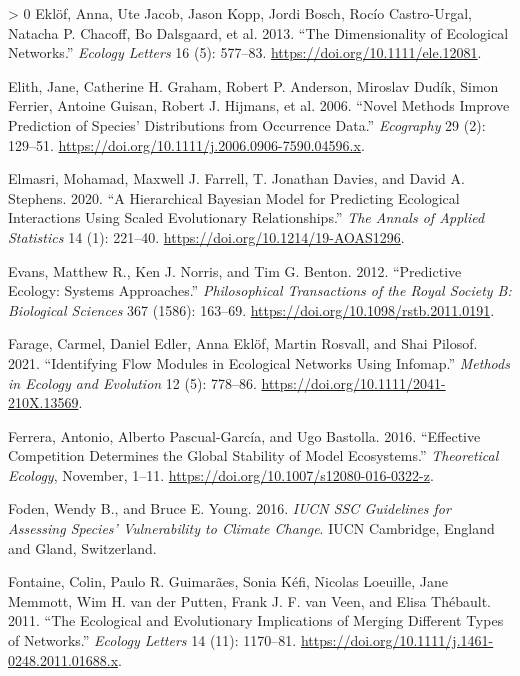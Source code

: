 \documentclass[10pt,oneside]{article}
\newlength{\cslhangindent}
\newenvironment{CSLReferences}[3] %
 {%
  \setlength{\parindent}{0pt}
  \ifodd #1 \everypar{\setlength{\hangindent}{\cslhangindent}}\ignorespaces\fi
  \ifnum #2 > 0
  \setlength{\parskip}{#2\baselineskip}
  \fi
 }%
 {}
\begin{document}
\begin{CSLReferences}{1}{0}
\leavevmode\hypertarget{ref-Eklof2013DimEco}{}%
Eklöf, Anna, Ute Jacob, Jason Kopp, Jordi Bosch, Rocío Castro-Urgal,
Natacha P. Chacoff, Bo Dalsgaard, et al. 2013. {``The Dimensionality of
Ecological Networks.''} \emph{Ecology Letters} 16 (5): 577--83.
\url{https://doi.org/10.1111/ele.12081}.

\leavevmode\hypertarget{ref-Elith2006NovMet}{}%
Elith, Jane, Catherine H. Graham, Robert P. Anderson, Miroslav Dudík,
Simon Ferrier, Antoine Guisan, Robert J. Hijmans, et al. 2006. {``Novel
Methods Improve Prediction of Species' Distributions from Occurrence
Data.''} \emph{Ecography} 29 (2): 129--51.
\url{https://doi.org/10.1111/j.2006.0906-7590.04596.x}.

\leavevmode\hypertarget{ref-Elmasri2020HieBay}{}%
Elmasri, Mohamad, Maxwell J. Farrell, T. Jonathan Davies, and David A.
Stephens. 2020. {``A Hierarchical Bayesian Model for Predicting
Ecological Interactions Using Scaled Evolutionary Relationships.''}
\emph{The Annals of Applied Statistics} 14 (1): 221--40.
\url{https://doi.org/10.1214/19-AOAS1296}.

\leavevmode\hypertarget{ref-Evans2012PreEco}{}%
Evans, Matthew R., Ken J. Norris, and Tim G. Benton. 2012. {``Predictive
Ecology: Systems Approaches.''} \emph{Philosophical Transactions of the
Royal Society B: Biological Sciences} 367 (1586): 163--69.
\url{https://doi.org/10.1098/rstb.2011.0191}.

\leavevmode\hypertarget{ref-Farage2021IdeFlo}{}%
Farage, Carmel, Daniel Edler, Anna Eklöf, Martin Rosvall, and Shai
Pilosof. 2021. {``Identifying Flow Modules in Ecological Networks Using
Infomap.''} \emph{Methods in Ecology and Evolution} 12 (5): 778--86.
\url{https://doi.org/10.1111/2041-210X.13569}.

\leavevmode\hypertarget{ref-Ferrera2016EffCom}{}%
Ferrera, Antonio, Alberto Pascual-García, and Ugo Bastolla. 2016.
{``Effective Competition Determines the Global Stability of Model
Ecosystems.''} \emph{Theoretical Ecology}, November, 1--11.
\url{https://doi.org/10.1007/s12080-016-0322-z}.

\leavevmode\hypertarget{ref-Foden2016IucSsc}{}%
Foden, Wendy B., and Bruce E. Young. 2016. \emph{IUCN SSC Guidelines for
Assessing Species' Vulnerability to Climate Change}. IUCN Cambridge,
England and Gland, Switzerland.

\leavevmode\hypertarget{ref-Fontaine2011EcoEvo}{}%
Fontaine, Colin, Paulo R. Guimarães, Sonia Kéfi, Nicolas Loeuille, Jane
Memmott, Wim H. van der Putten, Frank J. F. van Veen, and Elisa
Thébault. 2011. {``The Ecological and Evolutionary Implications of
Merging Different Types of Networks.''} \emph{Ecology Letters} 14 (11):
1170--81. \url{https://doi.org/10.1111/j.1461-0248.2011.01688.x}.


\end{CSLReferences}
\end{document}

